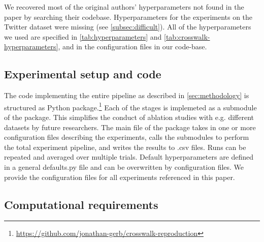 We recovered most of the original authors' hyperparameters not found in the paper by searching their codebase. Hyperparameters for the experiments on the Twitter dataset were missing (see \autoref{subsec:difficult}). All of the hyperparameters we used are specified in \autoref{tab:hyperparameters} and \autoref{tab:crosswalk-hyperparameters}, and in the configuration files in our code-base.

\subsection{Experimental setup and code}
\label{subsec:exp_code}

The code implementing the entire pipeline as described in \autoref{sec:methodology} is structured as Python package.\footnote{\url{https://github.com/jonathan-gerb/crosswalk-reproduction}} Each of the stages is implemeted as a submodule of the package. This simplifies the conduct of ablation studies with e.g. different datasets by future researchers. The main file of the package takes in one or more configuration files describing the experiments, calls the submodules to perform the total experiment pipeline, and writes the results to .csv files. Runs can be repeated and averaged over multiple trials. Default hyperparameters are defined in a general defaults.py file and can be overwritten by configuration files. We provide the configuration files for all experiments referenced in this paper.


\subsection{Computational requirements}

